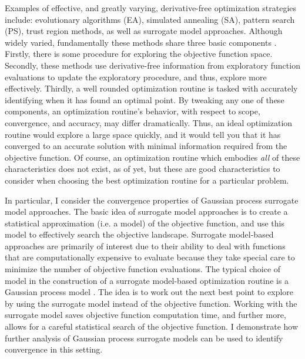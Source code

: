 \documentclass[12pt]{article}
\begin{document}
	
	Examples of effective, and greatly varying, derivative-free optimization strategies include: evolutionary algorithms (EA), simulated annealing (SA), pattern search (PS), trust region methods, as well as surrogate model approaches. 
	Although widely varied, fundamentally these methods share three basic components \cite{noGradBook}.
	Firstly, there is some procedure for exploring the objective function space. 
	Secondly, these methods use derivative-free information from exploratory function evaluations to update the exploratory procedure, and thus, explore more effectively.
	Thirdly, a well rounded optimization routine is tasked with accurately identifying when it has found an optimal point.
	By tweaking any one of these components, an optimization routine's behavior, with respect to scope, convergence, and accuracy, may differ dramatically.
	Thus, an ideal optimization routine would explore a large space quickly, and it would tell you that it has converged to an accurate solution with minimal information required from the objective function.
	Of course, an optimization routine which embodies {\it all} of these characteristics does not exist, as of yet, but these are good characteristics to consider when choosing the best optimization routine for a particular problem.


	In particular, I consider the convergence properties of Gaussian process surrogate model approaches.
	The basic idea of surrogate model approaches is to create a statistical approximation (i.e. a model) of the objective function, and use this model to effectively search the objective landscape. 
	Surrogate model-based approaches are primarily of interest due to their ability to deal with functions that are computationally expensive to evaluate because they take special care to minimize the number of objective function evaluations.
	The typical choice of model in the construction of a surrogate model-based optimization routine is a Gaussian process model \cite{gpSurrogate}.
	The idea is to work out the next best point to explore by using the surrogate model instead of the objective function.
	Working with the surrogate model saves objective function computation time, and further more, allows for a careful statistical search of the objective function. 
	I demonstrate how further analysis of Gaussian process surrogate models can be used to identify convergence in this setting.  
\end{document}

